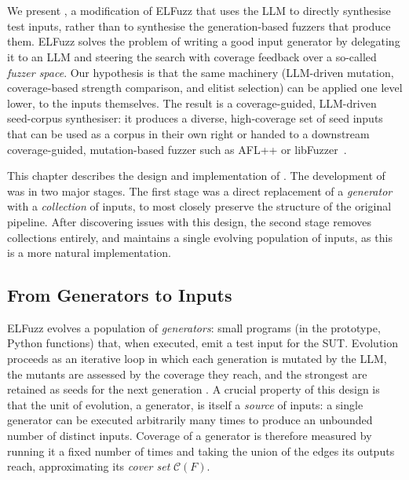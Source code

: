 \chapter{\toolname{}}
\label{ch:project}

We present \toolname{}, a modification of ELFuzz \cite{chen_2025_elfuzz} that uses the LLM to directly synthesise test inputs, rather than to synthesise the generation-based fuzzers that produce them. ELFuzz solves the problem of writing a good input generator by delegating it to an LLM and steering the search with coverage feedback over a so-called \textit{fuzzer space}. Our hypothesis is that the same machinery (LLM-driven mutation, coverage-based strength comparison, and elitist selection) can be applied one level lower, to the inputs themselves. The result is a coverage-guided, LLM-driven seed-corpus synthesiser: it produces a diverse, high-coverage set of seed inputs that can be used as a corpus in their own right or handed to a downstream coverage-guided, mutation-based fuzzer such as AFL++ or libFuzzer~\cite{fioraldi_2020_aflplusplus,serebryany_2016_libfuzzer}.

This chapter describes the design and implementation of \toolname{}. The development of \toolname{} was in two major stages. The first stage was a direct replacement of a \textit{generator} with a \textit{collection} of inputs, to most closely preserve the structure of the original pipeline. After discovering issues with this design, the second stage removes collections entirely, and maintains a single evolving population of inputs, as this is a more natural implementation.

\section{From Generators to Inputs}
\label{sec:gen-to-input}

ELFuzz evolves a population of \textit{generators}: small programs (in the prototype, Python functions) that, when executed, emit a test input for the SUT. Evolution proceeds as an iterative loop in which each generation is mutated by the LLM, the mutants are assessed by the coverage they reach, and the strongest are retained as seeds for the next generation \cite{chen_2025_elfuzz}. A crucial property of this design is that the unit of evolution, a generator, is itself a \textit{source} of inputs: a single generator can be executed arbitrarily many times to produce an unbounded number of distinct inputs. Coverage of a generator is therefore measured by running it a fixed number of times and taking the union of the edges its outputs reach, approximating its \textit{cover set} $\mathcal{C}(F)$.

